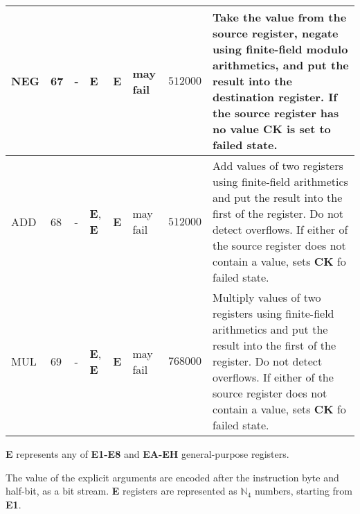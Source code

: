 \documentclass[9pt,oneside]{amsart}
\begin{document}
\begin{table}[h]
\begin{tabular}{l p{1cm} p{1.4cm} p{1cm} p{1cm} p{1.5cm} r p{6cm}}
NEG	&	67	&	-	&	\textbf{E}	&	\textbf{E}	&	may fail	&$512000$	&Take the value from the source register, negate using finite-field modulo arithmetics, and put the result into the destination register. If the source register has no value \textbf{CK} is set to failed state.	\\ \midrule
ADD	&	68	&	-	&	\textbf{E}, \textbf{E}	&	\textbf{E}	&	may fail	&$512000$	&Add values of two registers using finite-field arithmetics and put the result into the first of the register. Do not detect overflows. If either of the source register does not contain a value, sets \textbf{CK} fo failed state.	\\ \midrule
MUL	&	69	&	-	&	\textbf{E}, \textbf{E}	&	\textbf{E}	&	may fail	&$768000$	&Multiply values of two registers using finite-field arithmetics and put the result into the first of the register. Do not detect overflows. If either of the source register does not contain a value, sets \textbf{CK} fo failed state.	\\
\bottomrule
\end{tabular}
\end{table}


\textbf{E} represents any of \textbf{E1-E8} and \textbf{EA-EH} general-purpose registers.

The value of the explicit arguments are encoded after the instruction byte and half-bit, as a bit stream.
\textbf{E} registers are represented as $\mathbb{N}_4$ numbers, starting from \textbf{E1}.

\newpage
\end{document}
